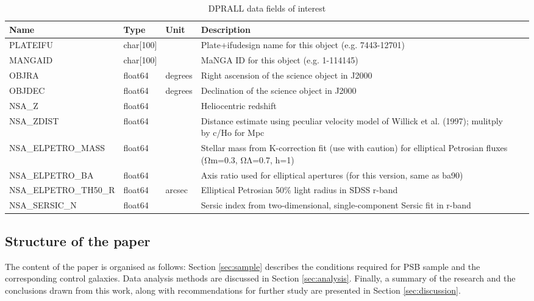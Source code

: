 \begin{table*}
\caption[DRPALL fields]{DPRALL data fields of interest}
\label{tab:DRPall-table}
\begin{tabular}{llllll}
\hline
Name & Type & Unit & Description &  &  \\
\hline
PLATEIFU & char{[}100{]} &  & Plate+ifudesign name for this object (e.g. 7443-12701) &  &  \\
MANGAID & char{[}100{]} &  & MaNGA ID for this object (e.g. 1-114145) &  &  \\
OBJRA & float64 & degrees & Right ascension of the science object in J2000 &  &  \\
OBJDEC & float64 & degrees & Declination of the science object in J2000 &  &  \\
NSA\_Z & float64 &  & Heliocentric redshift &  &  \\
NSA\_ZDIST & float64 &  & Distance estimate using peculiar velocity model of Willick et al. (1997); mulitply by c/Ho for Mpc &  &  \\
NSA\_ELPETRO\_MASS & float64 &  & Stellar mass from K-correction fit (use with caution) for elliptical Petrosian fluxes (Ωm=0.3, ΩΛ=0.7, h=1) &  &  \\
NSA\_ELPETRO\_BA & float64 &  & Axis ratio used for elliptical apertures (for this version, same as ba90) &  &  \\
NSA\_ELPETRO\_TH50\_R & float64 & arcsec & Elliptical Petrosian 50\% light radius in SDSS r-band &  &  \\
NSA\_SERSIC\_N & float64 &  & Sersic index from two-dimensional, single-component Sersic fit in r-band &  & \\
\hline
\end{tabular}
\end{table*}

\subsection{Structure of the paper}
The content of the paper is organised as follows: Section \ref{sec:sample} describes the conditions required for PSB sample and the corresponding control galaxies. Data analysis methods are discussed in Section \ref{sec:analysis}. Finally, a summary of the research and the conclusions drawn from this work, along with recommendations for further study are presented in Section \ref{sec:discussion}.
